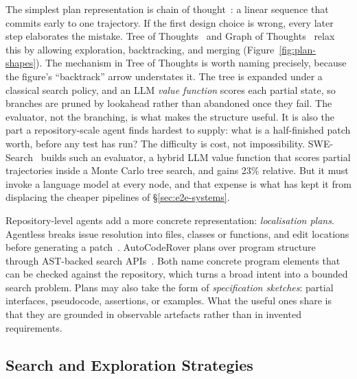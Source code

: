 \documentclass[
  english,        %
  font=times,     %
  twocolumn,      %
]{tumarticle}
\begin{document}
The simplest plan representation is chain of thought~\cite{wei2022chain}: a linear
sequence that commits early to one trajectory. If the first design choice is
wrong, every later step elaborates the mistake. Tree of
Thoughts~\cite{yao2023tree} and Graph of Thoughts~\cite{besta2024graph} relax
this by allowing exploration, backtracking, and merging
(Figure~\ref{fig:plan-shapes}). The mechanism in Tree of Thoughts is worth naming
precisely, because the figure's ``backtrack'' arrow understates it. The tree is
expanded under a classical search policy, and an LLM \emph{value function} scores
each partial state, so branches are pruned by lookahead rather than abandoned once
they fail. The evaluator, not the branching, is what makes the structure useful.
It is also the part a repository-scale agent finds hardest to supply: what is a
half-finished patch worth, before any test has run? The difficulty is cost, not
impossibility. SWE-Search~\cite{antoniades2024swesearch} builds such an evaluator,
a hybrid LLM value function that scores partial trajectories inside a Monte Carlo
tree search, and gains 23\% relative. But it must invoke a language model at every
node, and that expense is what has kept it from displacing the cheaper pipelines
of \S\ref{sec:e2e-systems}.

Repository-level agents add a more concrete representation:
\emph{localisation plans}. Agentless breaks issue resolution into files, classes
or functions, and edit locations before generating a
patch~\cite{xia2024agentless}. AutoCodeRover plans over program structure through
AST-backed search APIs~\cite{zhang2024autocoderover}. Both name concrete program
elements that can be checked against the repository, which turns a broad intent
into a bounded search problem. Plans may also take the form of \emph{specification
sketches}: partial interfaces, pseudocode, assertions, or examples. What the useful
ones share is that they are grounded in observable artefacts rather than in
invented requirements.

\subsection{Search and Exploration Strategies}
\end{document}
